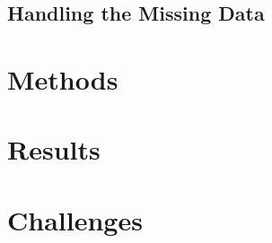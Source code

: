 \documentclass[12pt]{article}
\begin{document}
\subsection{Handling the Missing Data}

\section{Methods}

\section{Results}


\section{Challenges}


\end{document}
